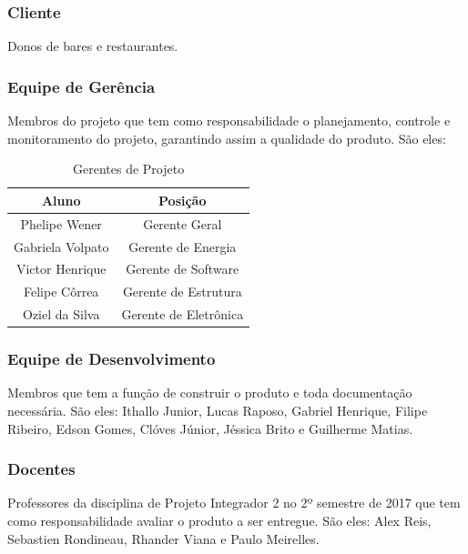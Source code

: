 			\subsubsection[Cliente]{Cliente}
				Donos de bares e restaurantes.
			
			\subsubsection[Equipe de Gerência]{Equipe de Gerência}
				Membros do projeto que tem como responsabilidade o planejamento, controle e monitoramento do projeto, garantindo assim a qualidade do produto. São eles:

				\begin{table}[H]
				\centering
				\caption{Gerentes de Projeto}
				\label{gerentes}
				\begin{tabular}{|c|c|}
				\hline
				\textbf{Aluno} & \textbf{Posição} \\ \hline
				Phelipe Wener & Gerente Geral \\ \hline
				Gabriela Volpato & Gerente de Energia \\ \hline
				Victor Henrique & Gerente de Software \\ \hline
				Felipe Côrrea & Gerente de Estrutura \\ \hline
				Oziel da Silva & Gerente de Eletrônica \\ \hline
				\end{tabular}
				\end{table}					

			\subsubsection[Equipe de Desenvolvimento]{Equipe de Desenvolvimento}
				Membros que tem a função de construir o produto e toda documentação necessária. São eles: Ithallo Junior, Lucas Raposo, Gabriel Henrique, Filipe Ribeiro, Edson Gomes, Clóves Júnior, Jéssica Brito e Guilherme Matias.

			\subsubsection[Docentes]{Docentes}

				Professores da disciplina de Projeto Integrador 2 no 2º semestre de 2017 que tem como responsabilidade avaliar o produto a ser entregue. São eles: Alex Reis, Sebastien Rondineau, Rhander Viana e Paulo Meirelles.

